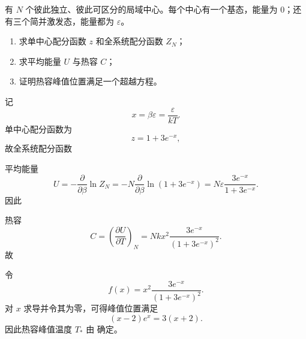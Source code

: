 \begin{question}[16分]
有 $N$ 个彼此独立、彼此可区分的局域中心。每个中心有一个基态，能量为 $0$；还有三个简并激发态，能量都为 $\varepsilon$。
\begin{enumerate}[label=（\arabic*）,leftmargin=2.8em,itemsep=0.2em]
\item 求单中心配分函数 $z$ 和全系统配分函数 $Z_N$；
\item 求平均能量 $U$ 与热容 $C$；
\item 证明热容峰值位置满足一个超越方程。
\end{enumerate}
\begin{solution}

记
\[
x=\beta\varepsilon=\frac{\varepsilon}{kT}.
\]
单中心配分函数为
\[
z=1+3e^{-x},
\]
故全系统配分函数

平均能量
\[
U=-\frac{\partial}{\partial \beta}\ln Z_N
=-N\frac{\partial}{\partial \beta}\ln(1+3e^{-x})
=N\varepsilon\frac{3e^{-x}}{1+3e^{-x}}.
\]
因此

热容
\[
C=\left(\frac{\partial U}{\partial T}\right)_N
=Nkx^2\frac{3e^{-x}}{(1+3e^{-x})^2}.
\]
故

令
\[
f(x)=x^2\frac{3e^{-x}}{(1+3e^{-x})^2}.
\]
对 $x$ 求导并令其为零，可得峰值位置满足
\[
( x-2)e^x=3(x+2).
\]
因此热容峰值温度 $T_\ast$ 由
确定。
\end{solution}
\end{question}

